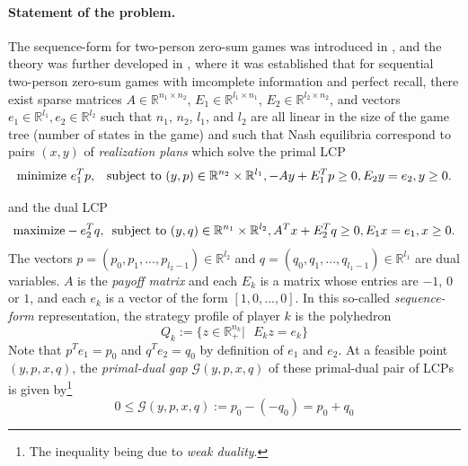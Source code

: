 \documentclass[envcountsame]{llncs} %
\begin{document}
\paragraph{\textbf{Statement of the problem.}}
The sequence-form for two-person zero-sum games was introduced in
\cite{koller1992complexity}, and the theory was further developed in
\cite{von1996efficient,vonequilibrium}, where it was established that
for sequential two-person zero-sum games with imcomplete information
and perfect recall, there exist sparse matrices $A \in \mathbb{R}^{n_1
  \times n_2}$, $E_1 \in \mathbb{R}^{l_1 \times n_1}$, $E_2 \in
\mathbb{R}^{l_2 \times n_2}$, and vectors $e_1 \in \mathbb{R}^{l_1},
e_2 \in \mathbb{R}^{l_2}$ such that $n_1$, $n_2$, $l_1$, and $l_2$ are
all linear in the size of the game tree (number of states in the game)
and such that Nash equilibria correspond to pairs $(x, y)$ of
\textit{realization plans} which solve the primal LCP
\begin{equation}
  \begin{aligned}
     \text{minimize }e_1^Tp, \hspace{.5em}\text{ subject to }(y,p) \in
     \mathbb{R}^{n_2} \times \mathbb{R}^{l_1}, -Ay +
    E_1^Tp \geq 0, E_2y = e_2, y \ge 0.
  \end{aligned}
  \label{eq:primal_pb}
\end{equation}

and the dual LCP
\begin{equation}
  \begin{aligned}
    \text{maximize}-e_2^Tq,\hspace{.5em}\text{subject to }(y,q) \in
    \mathbb{R}^{n_1} \times \mathbb{R}^{l_2}, A^Tx + E_2^Tq \geq 0,
    E_1x = e_1, x \ge 0.
  \end{aligned}
  \label{eq:dual_pb}
\end{equation}
The vectors $p = (p_0, p_1, ..., p_{l_2 - 1}) \in \mathbb{R}^{l_2}$
and $q = (q_0, q_1, ..., q_{l_1 - 1}) \in \mathbb{R}^{l_1}$ are dual
variables. 
$A$ is the \textit{payoff matrix} and each $E_k$ is a matrix whose
entries are $-1$, $0$ or $1$, and each $e_k$ is a vector of the form
$[1, 0, ..., 0]$. In this so-called \textit{sequence-form}
representation, the strategy profile of player $k$ is the polyhedron
\begin{equation}
  Q_k := \{z \in \mathbb{R}^{n_k}_+ |\text{ }E_kz = e_k\}
\label{eq:polyhedron}
\end{equation}
Note that $p^Te_1 = p_0$ and $q^Te_2 = q_0$ by definition of $e_1$ and
$e_2$. At a feasible point $(y, p, x, q)$, the \textit{primal-dual gap}
$\mathcal{G}(y, p, x, q)$ of these primal-dual pair of LCPs is given
by\footnote{The inequality being due to \textit{weak duality}.}
\begin{equation}
  0 \le \mathcal{G}(y, p, x, q) := p_0 - (-q_0) = p_0 + q_0
  \label{eq:dgap}
\end{equation}
\end{document}
